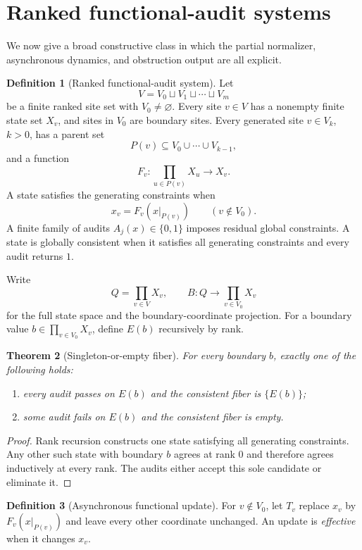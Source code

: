 \documentclass[11pt]{article}
\newtheorem{theorem}{Theorem}[section]
\theoremstyle{definition}
\newtheorem{definition}[theorem]{Definition}
\theoremstyle{remark}
\numberwithin{equation}{section}
\begin{document}
\section{Ranked functional-audit systems}\label{sec:functional}

We now give a broad constructive class in which the partial normalizer, asynchronous dynamics, and obstruction output are all explicit.

\begin{definition}[Ranked functional-audit system]
Let
\[
 V=V_0\sqcup V_1\sqcup\cdots\sqcup V_m
\]
be a finite ranked site set with $V_0\ne\varnothing$.  Every site $v\in V$
has a nonempty finite state set $X_v$, and sites in $V_0$ are boundary sites.
Every generated site $v\in V_k$, $k>0$, has a parent set
\[
 P(v)\subseteq V_0\cup\cdots\cup V_{k-1},
\]
and a function
\[
 F_v:\prod_{u\in P(v)}X_u\longrightarrow X_v.
\]
A state satisfies the generating constraints when
\[
 x_v=F_v(x|_{P(v)})\qquad(v\notin V_0).
\]
A finite family of audits $A_j(x)\in\{0,1\}$ imposes residual global constraints.  A state is globally consistent when it satisfies all generating constraints and every audit returns $1$.
\end{definition}

Write
\[
 Q=\prod_{v\in V}X_v,
 \qquad
 B:Q\longrightarrow\prod_{v\in V_0}X_v
\]
for the full state space and the boundary-coordinate projection.  For a
boundary value $b\in\prod_{v\in V_0}X_v$, define $E(b)$ recursively by
rank.

\begin{theorem}[Singleton-or-empty fiber]\label{thm:functional-fiber}
For every boundary $b$, exactly one of the following holds:
\begin{enumerate}[label=(\roman*)]
\item every audit passes on $E(b)$ and the consistent fiber is $\{E(b)\}$;
\item some audit fails on $E(b)$ and the consistent fiber is empty.
\end{enumerate}
\end{theorem}

\begin{proof}
Rank recursion constructs one state satisfying all generating constraints.  Any other such state with boundary $b$ agrees at rank $0$ and therefore agrees inductively at every rank.  The audits either accept this sole candidate or eliminate it.
\end{proof}

\begin{definition}[Asynchronous functional update]
For $v\notin V_0$, let $T_v$ replace $x_v$ by $F_v(x|_{P(v)})$ and leave every other coordinate unchanged.  An update is \emph{effective} when it changes $x_v$.
\end{definition}
\end{document}
